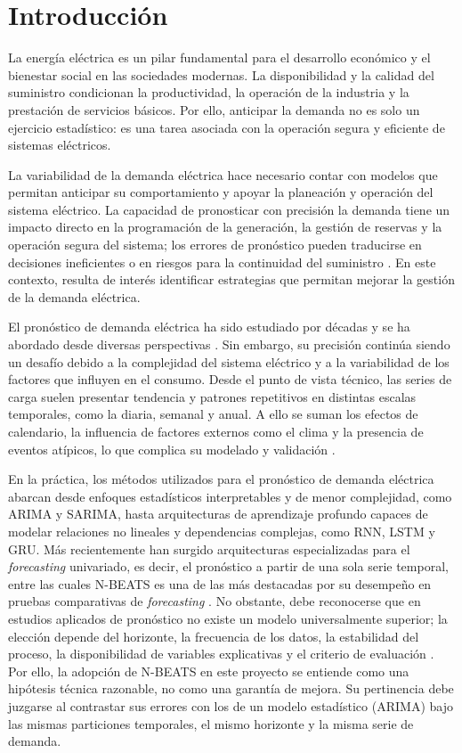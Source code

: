 \section{Introducción}

La energía eléctrica es un pilar fundamental para el desarrollo económico y el bienestar social en las sociedades modernas. La disponibilidad y la calidad del suministro condicionan la productividad, la operación de la industria y la prestación de servicios básicos. Por ello, anticipar la demanda no es solo un ejercicio estadístico: es una tarea asociada con la operación segura y eficiente de sistemas eléctricos.

La variabilidad de la demanda eléctrica hace necesario contar con modelos que permitan anticipar su comportamiento y apoyar la planeación y operación del sistema eléctrico. La capacidad de pronosticar con precisión la demanda tiene un impacto directo en la programación de la generación, la gestión de reservas y la operación segura del sistema; los errores de pronóstico pueden traducirse en decisiones ineficientes o en riesgos para la continuidad del suministro \parencite{gross1987,hong2020}. En este contexto, resulta de interés identificar estrategias que permitan mejorar la gestión de la demanda eléctrica.

El pronóstico de demanda eléctrica ha sido estudiado por décadas y se ha abordado desde diversas perspectivas \parencite{gross1987,alfares2002}. Sin embargo, su precisión continúa siendo un desafío debido a la complejidad del sistema eléctrico y a la variabilidad de los factores que influyen en el consumo. Desde el punto de vista técnico, las series de carga suelen presentar tendencia y patrones repetitivos en distintas escalas temporales, como la diaria, semanal y anual. A ello se suman los efectos de calendario, la influencia de factores externos como el clima y la presencia de eventos atípicos, lo que complica su modelado y validación \parencite{hyndman2021,hong2020,germansoto2025}.

En la práctica, los métodos utilizados para el pronóstico de demanda eléctrica abarcan desde enfoques estadísticos interpretables y de menor complejidad, como ARIMA y SARIMA, hasta arquitecturas de aprendizaje profundo capaces de modelar relaciones no lineales y dependencias complejas, como RNN, LSTM y GRU. Más recientemente han surgido arquitecturas especializadas para el \emph{forecasting} univariado, es decir, el pronóstico a partir de una sola serie temporal, entre las cuales N-BEATS es una de las más destacadas por su desempeño en pruebas comparativas de \emph{forecasting} \parencite{oreshkin2020}. No obstante, debe reconocerse que en estudios aplicados de pronóstico no existe un modelo universalmente superior; la elección depende del horizonte, la frecuencia de los datos, la estabilidad del proceso, la disponibilidad de variables explicativas y el criterio de evaluación \parencites{kuster2017,petropoulos2022}. Por ello, la adopción de N-BEATS en este proyecto se entiende como una hipótesis técnica razonable, no como una garantía de mejora. Su pertinencia debe juzgarse al contrastar sus errores con los de un modelo estadístico (ARIMA) bajo las mismas particiones temporales, el mismo horizonte y la misma serie de demanda.

